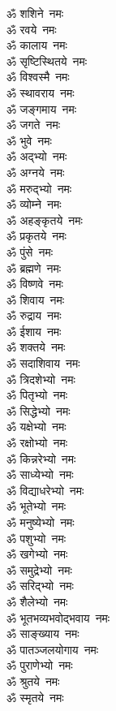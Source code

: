 \begin{multicols}{2}
\begin{flushleft}
ॐ शशिने~नमः\\
ॐ रवये~नमः\\
ॐ कालाय~नमः\hfill{}\\
ॐ सृष्टिस्थितये~नमः\\
ॐ विश्वस्मै~नमः\\
ॐ स्थावराय~नमः\\
ॐ जङ्गमाय~नमः\\
ॐ जगते~नमः\\
ॐ भुवे~नमः\\
ॐ अद्भ्यो~नमः\\
ॐ अग्नये~नमः\\
ॐ मरुद्भ्यो~नमः\\
ॐ व्योम्ने~नमः\hfill{}\\
ॐ अहङ्कृतये~नमः\\
ॐ प्रकृतये~नमः\\
ॐ पुंसे~नमः\\
ॐ ब्रह्मणे~नमः\\
ॐ विष्णवे~नमः\\
ॐ शिवाय~नमः\\
ॐ रुद्राय~नमः\\
ॐ ईशाय~नमः\\
ॐ शक्तये~नमः\\
ॐ सदाशिवाय~नमः\hfill{}\\
ॐ त्रिदशेभ्यो~नमः\\
ॐ पितृभ्यो~नमः\\
ॐ सिद्धेभ्यो~नमः\\
ॐ यक्षेभ्यो~नमः\\
ॐ रक्षोभ्यो~नमः\\
ॐ किन्नरेभ्यो~नमः\\
ॐ साध्येभ्यो~नमः\\
ॐ विद्याधरेभ्यो~नमः\\
ॐ भूतेभ्यो~नमः\\
ॐ मनुष्येभ्यो~नमः\hfill{}\\
ॐ पशुभ्यो~नमः\\
ॐ खगेभ्यो~नमः\\
ॐ समुद्रेभ्यो~नमः\\
ॐ सरिद्भ्यो~नमः\\
ॐ शैलेभ्यो~नमः\\
ॐ भूतभव्यभवोद्भवाय~नमः\\
ॐ साङ्ख्याय~नमः\\
ॐ पातञ्जलयोगाय~नमः\\
ॐ पुराणेभ्यो~नमः\\
ॐ श्रुतये~नमः\hfill{}\\
ॐ स्मृतये~नमः\\

\end{flushleft}
\end{multicols}
